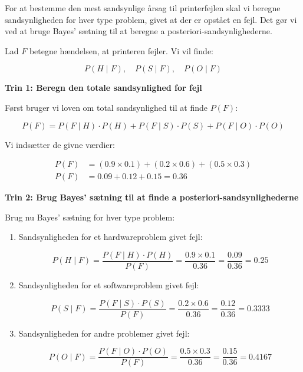 \begin{solution}
    For at bestemme den mest sandsynlige årsag til printerfejlen skal vi beregne sandsynligheden for hver type problem, givet at der er opstået en fejl. Det gør vi ved at bruge Bayes' sætning til at beregne a posteriori-sandsynlighederne.

Lad $F$ betegne hændelsen, at printeren fejler. Vi vil finde:

\[
P(H \mid F), \quad P(S \mid F), \quad P(O \mid F)
\]

\textbf{Trin 1: Beregn den totale sandsynlighed for fejl
}

Først bruger vi loven om total sandsynlighed til at finde $P(F)$:

\[
P(F) = P(F \mid H) \cdot P(H) + P(F \mid S) \cdot P(S) + P(F \mid O) \cdot P(O)
\]

Vi indsætter de givne værdier:

\[
\begin{aligned}
P(F) &= (0.9 \times 0.1) + (0.2 \times 0.6) + (0.5 \times 0.3) \\
P(F) &= 0.09 + 0.12 + 0.15 = 0.36
\end{aligned}
\]

\textbf{Trin 2: Brug Bayes' sætning til at finde a posteriori-sandsynlighederne
}

Brug nu Bayes' sætning for hver type problem:

\begin{enumerate}
    \item Sandsynligheden for et hardwareproblem givet fejl: \vspace{10pt}
    
    \[
    P(H \mid F)=\frac{P(F \mid H) \cdot P(H)}{P(F)}=\frac{0.9 \times 0.1}{0.36}=\frac{0.09}{0.36}=0.25
    \]
    \vspace{10pt}
    \item Sandsynligheden for et softwareproblem givet fejl: \vspace{10pt}
    
    \[
    P(S \mid F)=\frac{P(F \mid S) \cdot P(S)}{P(F)}=\frac{0.2 \times 0.6}{0.36}=\frac{0.12}{0.36}=0.3333
    \]
    \vspace{10pt}
    \item Sandsynligheden for andre problemer givet fejl: \vspace{10pt}
    
    \[
    P(O \mid F)=\frac{P(F \mid O) \cdot P(O)}{P(F)}=\frac{0.5 \times 0.3}{0.36}=\frac{0.15}{0.36}=0.4167
    \]
    \vspace{10pt}
\end{enumerate}


\end{solution}
